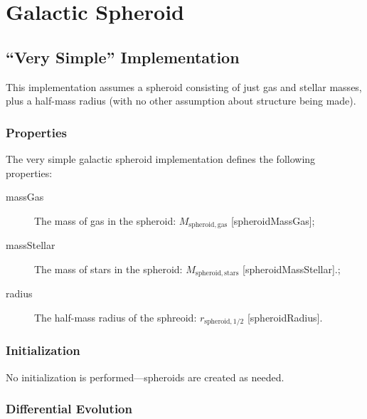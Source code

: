 \section{Galactic Spheroid}\label{sec:ComponentSpheroid}

\subsection{``Very Simple'' Implementation}

This implementation assumes a spheroid consisting of just gas and stellar masses, plus a half-mass radius (with no other assumption about structure being made).

\subsubsection{Properties}

The very simple galactic spheroid implementation defines the following properties:
\begin{description}
 \item [{\normalfont \ttfamily massGas}] The mass of gas in the spheroid: $M_\mathrm{spheroid, gas}$ [{\normalfont \ttfamily spheroidMassGas}];
 \item [{\normalfont \ttfamily massStellar}] The mass of stars in the spheroid: $M_\mathrm{spheroid, stars}$ [{\normalfont \ttfamily spheroidMassStellar}].;
 \item [{\normalfont \ttfamily radius}] The half-mass radius of the sphreoid: $r_\mathrm{spheroid, 1/2}$ [{\normalfont \ttfamily spheroidRadius}].
\end{description}

\subsubsection{Initialization}

No initialization is performed---spheroids are created as needed.

\subsubsection{Differential Evolution}

